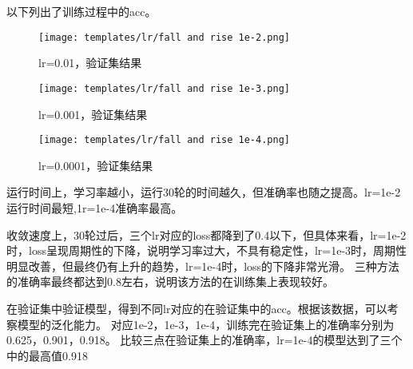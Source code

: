 \documentclass[addpoints,answers]{exam}
\begin{document}
以下列出了训练过程中的acc。

\begin{figure}[H]
\centering
\begin{minipage}[t]{0.48\textwidth}
\centering
\texttt{[image: templates/lr/fall and rise 1e-2.png]}
\caption{lr=0.01，验证集结果}
\end{minipage}
\begin{minipage}[t]{0.48\textwidth}
\centering
\texttt{[image: templates/lr/fall and rise 1e-3.png]}
\caption{lr=0.001，验证集结果}
\end{minipage}
\begin{minipage}[t]{0.48\textwidth}
\centering
\texttt{[image: templates/lr/fall and rise 1e-4.png]}
\caption{lr=0.0001，验证集结果}
\end{minipage}
\end{figure}

运行时间上，学习率越小，运行30轮的时间越久，但准确率也随之提高。lr=1e-2运行时间最短,1r=1e-4准确率最高。

收敛速度上，30轮过后，三个lr对应的loss都降到了0.4以下，但具体来看，lr=1e-2时，loss呈现周期性的下降，说明学习率过大，不具有稳定性，lr=1e-3时，周期性明显改善，但最终仍有上升的趋势，lr=1e-4时，loss的下降非常光滑。
三种方法的准确率最终都达到0.8左右，说明该方法的在训练集上表现较好。

在验证集中验证模型，得到不同lr对应的在验证集中的acc。根据该数据，可以考察模型的泛化能力。
对应1e-2，1e-3，1e-4，训练完在验证集上的准确率分别为0.625，0.901，0.918。
比较三点在验证集上的准确率，lr=1e-4的模型达到了三个中的最高值0.918
\end{document}
